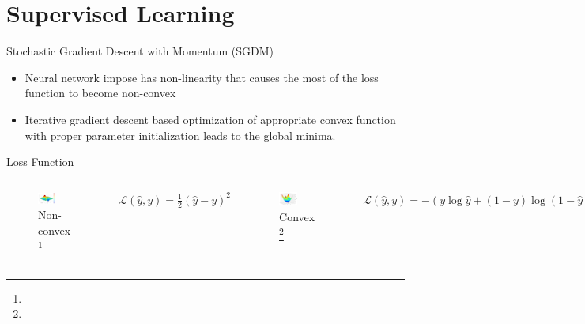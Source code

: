 \documentclass[10pt]{beamer}
\begin{document}

\section{Supervised Learning}

\begin{frame}{Stochastic Gradient Descent with Momentum (SGDM)}
   \begin{itemize}
       \item Neural network impose has non-linearity that causes the most of the loss function to become non-convex
       \item Iterative gradient descent based optimization of appropriate convex function with proper parameter initialization leads to the global minima. 
   \end{itemize}
   
\begin{block}{Loss Function}
     \begin{columns}
            \begin{figure}
                \centering
                \includegraphics[width=0.5\textwidth]{Images/nonconvex.png}
                \caption{Non-convex \footnote[frame]{}}
            \end{figure}
            \vspace{-5pt}
            \centering
            $\mathcal{L}(\hat{y}, y)=\frac{1}{2}(\hat{y}-y)^{2}$
            
            \begin{figure}
                \centering
                \includegraphics[width=0.5\textwidth]{Images/convex.png}
                \caption{Convex \footnote[frame]{}}
            \end{figure}    
            \vspace{-5pt}
            \centering
            $\mathcal{L}(\hat{y}, y)=-(y \log \hat{y}+(1-y) \log (1-\hat{y}))$
     \end{columns}
\end{block}
\end{frame}
\end{document}
